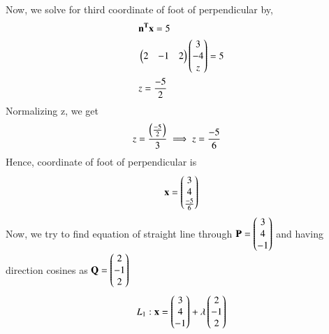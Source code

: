 Now, we solve for third coordinate of foot of perpendicular by,
\begin{align}
&\mathbf{n^Tx} = 5 \\
& \begin{pmatrix}2 & -1 & 2\end{pmatrix}\begin{pmatrix}3 \\ -4 \\ z\end{pmatrix} = 5\\
& z = \frac{-5}{2}
\end{align}
Normalizing z, we get
\begin{align}
	& z = \frac{\left(\frac{-5}{2}\right)}{3} \implies z = \frac{-5}{6}
\end{align}
Hence, coordinate of foot of perpendicular is
\begin{align}
	\mathbf{x} = \begin{pmatrix}3 \\ 4\\\frac{-5}{6}\end{pmatrix}
\end{align}
Now, we try to find equation of straight line through $\mathbf{P}= \begin{pmatrix}3\\4\\-1\end{pmatrix}$ and having direction cosines as $\mathbf{Q}= \begin{pmatrix}2 \\-1 \\ 2\end{pmatrix}$
\begin{align}
	L_1 :  \mathbf{x} = \begin{pmatrix}3\\4\\-1\end{pmatrix} + \lambda\begin{pmatrix}2 \\-1\\2\end{pmatrix}
\end{align}
